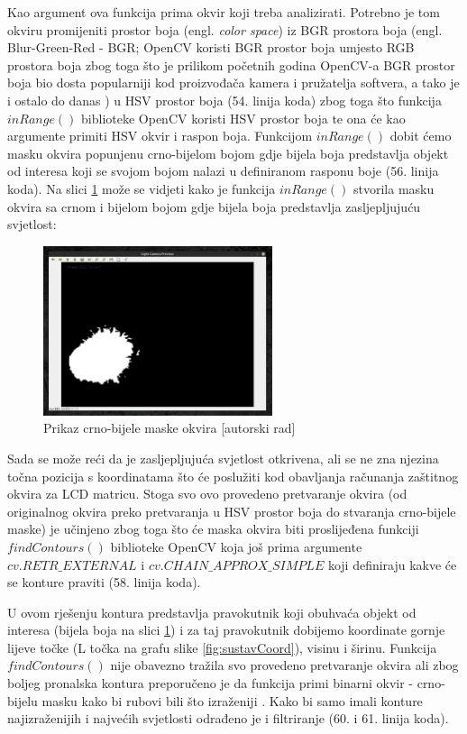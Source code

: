 \documentclass{foi}
\begin{document}
Kao argument ova funkcija prima okvir koji treba analizirati. Potrebno je tom okviru promijeniti prostor boja (engl. \emph{color space}) iz BGR prostora boja (engl. Blur-Green-Red - BGR; OpenCV koristi BGR prostor boja umjesto RGB prostora boja zbog toga što je prilikom početnih godina OpenCV-a BGR prostor boja bio dosta popularniji kod proizvođača kamera i pružatelja softvera, a tako je i ostalo do danas \cite{Satya}) u HSV prostor boja (54. linija koda) zbog toga što funkcija $inRange()$ biblioteke OpenCV koristi HSV prostor boja te ona će kao argumente primiti HSV okvir i raspon boja. Funkcijom $inRange()$ dobit ćemo masku okvira popunjenu crno-bijelom bojom gdje bijela boja predstavlja objekt od interesa koji se svojom bojom nalazi u definiranom rasponu boje \cite{OpenCV3} (56. linija koda). Na slici \ref{fig:maska} može se vidjeti kako je funkcija $inRange()$ stvorila masku okvira sa crnom i bijelom bojom gdje bijela boja predstavlja zasljepljujuću svjetlost:

\begin{figure}[h!]
    \centering
    \includegraphics[width=0.6\textwidth]{slike/cb_maska_okvir}
    \caption{Prikaz crno-bijele maske okvira [autorski rad]}
    \label{fig:maska}
\end{figure}

Sada se može reći da je zasljepljujuća svjetlost otkrivena, ali se ne zna njezina točna pozicija s koordinatama što će poslužiti kod obavljanja računanja zaštitnog okvira za LCD matricu. Stoga svo ovo provedeno pretvaranje okvira (od originalnog okvira preko pretvaranja u HSV prostor boja do stvaranja crno-bijele maske) je učinjeno zbog toga što će maska okvira biti proslijeđena funkciji $findContours()$ biblioteke OpenCV koja još prima argumente $cv.RETR\_EXTERNAL$ i $cv.CHAIN\_APPROX\_SIMPLE$ koji definiraju kakve će se konture praviti (58. linija koda).

U ovom rješenju kontura predstavlja pravokutnik koji obuhvaća objekt od interesa (bijela boja na slici \ref{fig:maska}) i za taj pravokutnik dobijemo koordinate gornje lijeve točke (L točka na grafu slike \ref{fig:sustavCoord}), visinu i širinu. Funkcija $findContours()$ nije obavezno tražila svo provedeno pretvaranje okvira ali zbog boljeg pronalska kontura preporučeno je da funkcija primi binarni okvir - crno-bijelu masku kako bi rubovi bili što izraženiji \cite{OpenCV4}. Kako bi samo imali konture najizraženijih i najvećih svjetlosti odrađeno je i filtriranje (60. i 61. linija koda).
\end{document}
